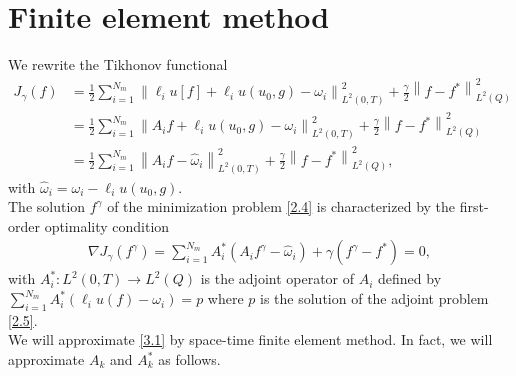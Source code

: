 \documentclass[]{article}
\begin{document}
\section{Finite element method}\label{section4}
We rewrite the Tikhonov functional
\begin{align*}
	J_\gamma(f)&=\frac{1}{2}\sum_{i=1}^{N_m}\left\|\ell_i u[f]+\ell_i u(u_0, g)-\omega_i\right\|^2_{L^2(0, T)}+\frac{\gamma}{2}\left\|f-f^*\right\|^2_{L^2(Q)}\\
	&=\frac{1}{2}\sum_{i=1}^{N_m}\left\|A_if+\ell_i u(u_0, g)-\omega_i\right\|^2_{L^2(0, T)}+\frac{\gamma}{2}\left\|f-f^*\right\|^2_{L^2(Q)}\\
	&=\frac{1}{2}\sum_{i=1}^{N_m}\left\|A_if-\hat{\omega}_i\right\|^2_{L^2(0, T)}+\frac{\gamma}{2}\left\|f-f^*\right\|^2_{L^2(Q)},
\end{align*}
with $\hat{\omega}_i=\omega_i-\ell_i u(u_0, g)$.
\\
The solution $f^\gamma$ of the minimization problem \eqref{2.4} is characterized by the first-order optimality condition
\begin{align}\label{3.1}
	\nabla J_\gamma(f^\gamma)= \sum_{i=1}^{N_m}A^*_i(A_if^\gamma-\hat{\omega}_i)+\gamma(f^\gamma-f^*)=0,
\end{align}
with $A_i^*: L^2(0, T)\to L^2(Q)$ is the adjoint operator of $A_i$ defined by $\sum_{i=1}^{N_m}A_i^*\left(\ell_i u(f) - \omega_i\right) = p$ where $p$ is the solution of the adjoint problem \eqref{2.5}. 
\\
We will approximate \eqref{3.1} by space-time finite element method. In fact, we will approximate $A_k$ and $A^*_k$ as follows.
\end{document}
